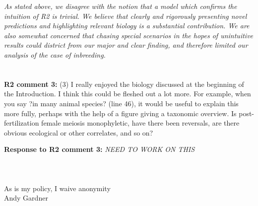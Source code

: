 \documentclass[12pt,letterpaper]{article}
\newcommand{\yb}[1]{{ \color{blue} #1}}
\begin{document}
\emph{As stated above, we disagree with the notion that a model which confirms the intuition of R2 is trivial. We believe that clearly and rigorously presenting novel predictions and highlighting relevant biology is a substantial contribution. We are also somewhat concerned that chasing special scenarios in the hopes of unintuitive results could district from our major and clear finding, and therefore limited our analysis of the case of inbreeding.}
\\
\\
\\
{\bf{R2 comment 3:}}  (3) I really enjoyed the biology discussed at the beginning of the Introduction. I think this could be fleshed out a lot more. For example, when you say ?in many animal species? (line 46), it would be useful to explain this more fully, perhaps with the help of a figure giving a taxonomic overview. Is post-fertilization female meiosis monophyletic, have there been reversals, are there obvious ecological or other correlates, and so on?

{\bf{Response to R2 comment 3:}}  \emph{\yb{NEED TO WORK ON THIS}}
\\
\\
\\
\\
As is my policy, I waive anonymity
\\
Andy Gardner
\end{document}
